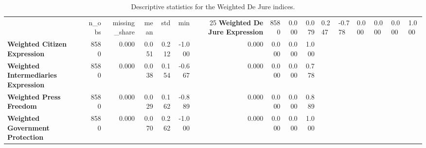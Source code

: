 \begin{table}
\caption{Descriptive statistics for the Weighted De Jure indices.}
\label{tab:desc_stats}
\begin{tabular}{lrrrrrrrrr}
\toprule
 & n_obs & missing_share & mean & std & min & 25%
\midrule
\textbf{Weighted De Jure Expression} & 8580 & 0.000 & 0.079 & 0.247 & -0.778 & 0.000 & 0.000 & 0.000 & 1.000 \\
\textbf{Weighted Citizen Expression} & 8580 & 0.000 & 0.051 & 0.212 & -1.000 & 0.000 & 0.000 & 0.000 & 1.000 \\
\textbf{Weighted Intermediaries Expression} & 8580 & 0.000 & 0.038 & 0.154 & -0.667 & 0.000 & 0.000 & 0.000 & 0.778 \\
\textbf{Weighted Press Freedom} & 8580 & 0.000 & 0.029 & 0.162 & -0.889 & 0.000 & 0.000 & 0.000 & 0.889 \\
\textbf{Weighted Government Protection} & 8580 & 0.000 & 0.070 & 0.262 & -1.000 & 0.000 & 0.000 & 0.000 & 1.000 \\
\bottomrule
\end{tabular}
\end{table}
